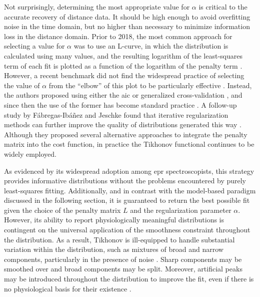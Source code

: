 Not surprisingly, determining the most appropriate value for $\alpha$ is critical to the accurate recovery of distance data. It should be high enough to avoid overfitting noise in the time domain, but no higher than necessary to minimize information loss in the distance domain. Prior to 2018, the most common approach for selecting a value for $\alpha$ was to use an L-curve, in which the distribution is calculated using many values, and the resulting logarithm of the least-squares term of each fit is plotted as a function of the logarithm of the penalty term \citep*{Chiang2005, Jeschke2004}. However, a recent benchmark did not find the widespread practice of selecting the value of $\alpha$ from the “elbow” of this plot to be particularly effective \citep*{Edwards2018}. Instead, the authors proposed using either the \gls{aic} \citep*{Akaike1973} or generalized cross-validation \citep*{Lukas2006}, and since then the use of the former has become standard practice \citep*{FabregasIbanez2020a}. A follow-up study by Fábregas-Ibáñez and Jeschke found that iterative regularization methods can further improve the quality of distributions generated this way \citep*{FabregasIbanez2019}. Although they proposed several alternative approaches to integrate the penalty matrix into the cost function, in practice the Tikhonov functional continues to be widely employed.

As evidenced by its widespread adoption among \gls{epr} spectroscopists, this strategy provides informative distributions without the problems encountered by purely least-squares fitting. Additionally, and in contrast with the model-based paradigm discussed in the following section, it is guaranteed to return the best possible fit given the choice of the penalty matrix $L$ and the regularization parameter $\alpha$. However, its ability to report physiologically meaningful distributions is contingent on the universal application of the smoothness constraint throughout the distribution. As a result, Tikhonov is ill-equipped to handle substantial variation within the distribution, such as mixtures of broad and narrow components, particularly in the presence of noise \citep*{Stein2015}. Sharp components may be smoothed over and broad components may be split. Moreover, artificial peaks may be introduced throughout the distribution to improve the fit, even if there is no physiological basis for their existence \citep*{Casey2015, Jeschke2012}.

